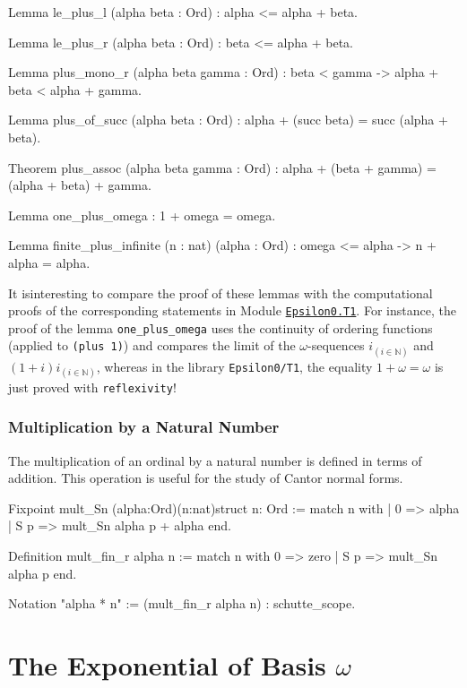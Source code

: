 {\begin{Coqsrc}
Lemma le_plus_l (alpha beta : Ord) : alpha <= alpha + beta.

Lemma le_plus_r (alpha beta : Ord) :  beta <= alpha + beta.

Lemma plus_mono_r (alpha beta gamma : Ord) : 
    beta < gamma -> alpha + beta < alpha + gamma.

Lemma plus_of_succ (alpha beta : Ord) :
    alpha + (succ beta) = succ (alpha + beta).

Theorem plus_assoc (alpha beta gamma : Ord) :
  alpha + (beta + gamma) = (alpha + beta) + gamma.

Lemma one_plus_omega :  1 + omega = omega.

Lemma finite_plus_infinite (n : nat) (alpha : Ord) :
  omega <= alpha -> n + alpha = alpha.
\end{Coqsrc} 


It isinteresting to compare the proof of these lemmas with the 
computational proofs of the corresponding statements in Module
\href{../theories/html/hydras.Epsilon0.T1.html}%
{\texttt{Epsilon0.T1}}. 
For instance, the proof of the lemma 
\texttt{one\_plus\_omega} uses the continuity of ordering functions (applied to  \texttt{(plus 1)}) and compares the limit of the $\omega$-sequences $i_{(i \in \mathbb{N})}$ and
$(1+i)i_{(i \in \mathbb{N})}$, whereas in the library  \texttt{Epsilon0/T1}, the equality 
$1+\omega=\omega$ is just proved with \texttt{reflexivity}!



\subsubsection{Multiplication by a Natural Number}

The multiplication of an ordinal by a natural number is defined in terms of addition.
This operation is useful for the study of Cantor normal forms.

\begin{Coqsrc}
Fixpoint mult_Sn (alpha:Ord)(n:nat){struct n}: Ord :=
 match n with 
            | 0 => alpha
            | S p => mult_Sn  alpha p + alpha
 end.

Definition mult_fin_r alpha n :=
  match n with
      0 => zero
    | S p => mult_Sn alpha p
  end.

Notation "alpha * n" := (mult_fin_r alpha n) : schutte_scope.
\end{Coqsrc}

\section{The Exponential of Basis \texorpdfstring{$\omega$}{omega}}

}
